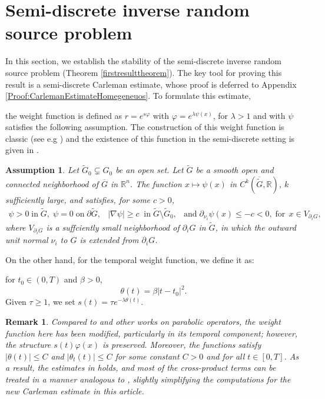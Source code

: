\documentclass[11pt,oneside,leqno]{amsart}
\numberwithin{equation}{section}
\numberwithin{equation}{section}
\newtheorem{remark}[theorem]{Remark}
\newtheorem{assumption}[theorem]{Assumption}
\begin{document}
\section{Semi-discrete inverse random source problem}\label{sec:RandomSource}
In this section, we establish the stability of the semi-discrete inverse random source problem (Theorem \ref{firstresulttheorem}). 
The key tool for proving this result is a semi-discrete Carleman estimate, whose proof is deferred to {  Appendix \ref{Proof:CarlemanEstimateHomegeneuos}}. To formulate this estimate, { 
the weight function is defined as $r=e^{s\varphi}$ with $\varphi=e^{\lambda \psi(x)}$, for $\lambda>1$ and with $\psi$ satisfies the following assumption. The construction of this weight function is classic (see  e.g \cite{Emanuilov:1995}) and the existence of this function in the semi-discrete setting is given in \cite[Appendix A]{BHLR:2010b}. 
\begin{assumption}\label{Assumption_data_inteior}
    Let $\tilde{G}_0\subsetneq G_0$ be an open set. Let $\tilde{G}$ be a smooth open and connected neighborhood of $\overline{G}$ in $\mathbb{R}^n$. The function $x\mapsto \psi(x)$ in $C^k(\overline{\tilde{G}},\mathbb{R})$, $k$ sufficiently large, and satisfies, for some $c>0$,
\begin{equation*}
\begin{array}{ccc}
    \psi>0\; \text{in}\; \tilde{G},\; \psi=0\; \text{on} \;\partial\tilde{G}, & |\nabla\psi|\geq c\;\; \text{in}\; \tilde{G}\setminus \tilde{G}_0, & \text{and}\; \partial_{\nu_i}\psi(x)\leq -c<0,\;\text{for}\,\; x\in V_{\partial_i G}, 
\end{array}
\end{equation*}
where $V_{\partial_iG}$ is a suffciently small neighborhood of $\partial_iG$ in $\tilde{G}$, in which the outward unit normal $\nu_i$ to $G$ is extended from $\partial_i G$. 
\end{assumption}
On the other hand, for the temporal weight function, we define it as:} for $t_0\in (0,T)$ and $\beta>0$,
\begin{equation}\label{theta-delta}
    \theta(t)=\beta|t-t_0|^2.
\end{equation}
Given $\tau\geq 1$, we set $
s(t)=\tau e^{-\lambda \theta(t)}.
$
\begin{remark}
    Compared to \cite{LPP:2025} and other works on parabolic operators, the weight function here has been modified, particularly in its temporal component; however, the structure $s(t)\varphi(x)$ is preserved. Moreover, the functions satisfy $|\theta(t)| \leq C$ and $|\theta_t(t)| \leq C$ for some constant $C>0$ and for all $t \in [0,T]$. As a result, the estimates in \cite{BHLR:2010b,AA:perez:2024} holds, and most of the cross-product terms can be treated in a manner analogous to \cite{LPP:2025}, slightly simplifying the computations for the new Carleman estimate in this article.
\end{remark}
\end{document}
